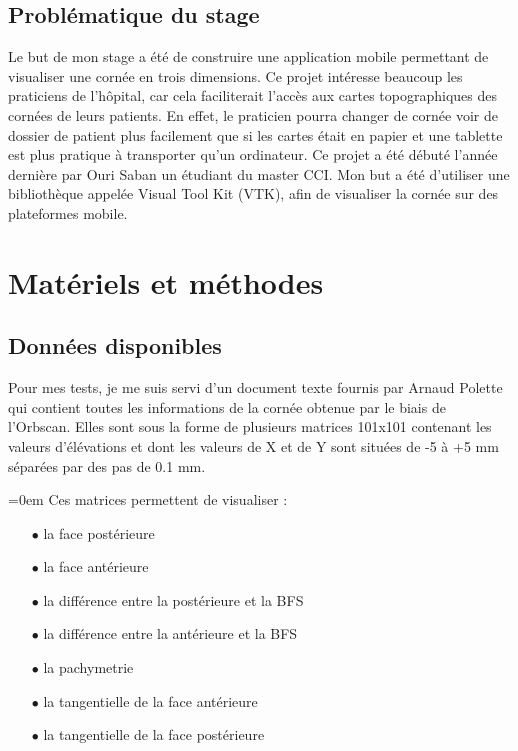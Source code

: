 \documentclass[a4paper,12pt]{article}
\begin{document}
\newpage
	\subsection{Problématique du stage}
Le but de mon stage a été de construire une application mobile permettant de visualiser une cornée en trois dimensions. Ce projet intéresse beaucoup les praticiens de l'hôpital, car cela faciliterait l'accès aux cartes topographiques des cornées de leurs patients. En effet, le praticien pourra changer de cornée voir de dossier de patient plus facilement que si les cartes était en papier et une tablette est plus pratique à transporter qu'un ordinateur. Ce projet a été débuté l'année dernière par Ouri Saban un étudiant du master CCI. Mon but a été d'utiliser une bibliothèque appelée Visual Tool Kit (VTK), afin de visualiser la cornée sur des plateformes mobile.


\newpage
\section{Matériels et méthodes}
	\subsection{Données disponibles}
Pour mes tests, je me suis servi d'un document texte fournis par Arnaud Polette qui contient toutes les informations de la cornée obtenue par le biais de l'Orbscan. Elles sont sous la forme de plusieurs matrices 101x101 contenant les valeurs d'élévations et dont les valeurs de X et de Y sont situées de -5 à +5 mm séparées par des pas de 0.1 mm.

\vspace{0.25cm}
\parindent=0em Ces matrices permettent de visualiser : %
\begin{itemize}\setlength{\itemsep}{1mm}
	\item[$\bullet$] la face postérieure 
	\item[$\bullet$] la face antérieure
	\item[$\bullet$] la différence entre la postérieure et la BFS
	\item[$\bullet$] la différence entre la antérieure et la BFS
	\item[$\bullet$] la pachymetrie
	\item[$\bullet$] la tangentielle de la face antérieure
	\item[$\bullet$] la tangentielle de la face postérieure
\end{itemize}
\end{document}
